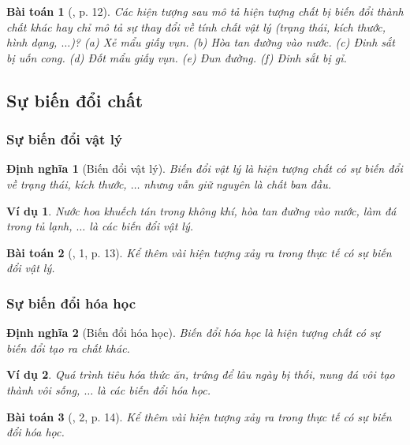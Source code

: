 \documentclass{article}
\newtheorem{baitoan}{Bài toán}
\newtheorem{dinhnghia}{Định nghĩa}
\newtheorem{vidu}{Ví dụ}
\begin{document}
\begin{baitoan}[\cite{SGK_KHTN_8_Canh_Dieu}, p. 12]
	Các hiện tượng sau mô tả hiện tượng chất bị biến đổi thành chất khác hay chỉ mô tả sự thay đổi về tính chất vật lý (trạng thái, kích thước, hình dạng, $\ldots$)? (a) Xẻ mẩu giấy vụn. (b) Hòa tan đường vào nước. (c) Đinh sắt bị uốn cong. (d) Đốt mẩu giấy vụn. (e) Đun đường. (f) Đinh sắt bị gỉ.
\end{baitoan}

\subsection{Sự biến đổi chất}

\subsubsection{Sự biến đổi vật lý}

\begin{dinhnghia}[Biến đổi vật lý]
	\emph{Biến đổi vật lý} là hiện tượng chất có sự biến đổi về trạng thái, kích thước, $\ldots$ nhưng vẫn giữ nguyên là chất ban đầu.
\end{dinhnghia}

\begin{vidu}
	Nước hoa khuếch tán trong không khí, hòa tan đường vào nước, làm đá trong tủ lạnh, $\ldots$ là các biến đổi vật lý.
\end{vidu}

\begin{baitoan}[\cite{SGK_KHTN_8_Canh_Dieu}, 1, p. 13]
	Kể thêm vài hiện tượng xảy ra trong thực tế có sự biến đổi vật lý.
\end{baitoan}

\subsubsection{Sự biến đổi hóa học}

\begin{dinhnghia}[Biến đổi hóa học]
	\emph{Biến đổi hóa học} là hiện tượng chất có sự biến đổi tạo ra chất khác.
\end{dinhnghia}

\begin{vidu}
	Quá trình tiêu hóa thức ăn, trứng để lâu ngày bị thối, nung đá vôi tạo thành vôi sống, $\ldots$ là các biến đổi hóa học.
\end{vidu}

\begin{baitoan}[\cite{SGK_KHTN_8_Canh_Dieu}, 2, p. 14]
	Kể thêm vài hiện tượng xảy ra trong thực tế có sự biến đổi hóa học.
\end{baitoan}
\end{document}
